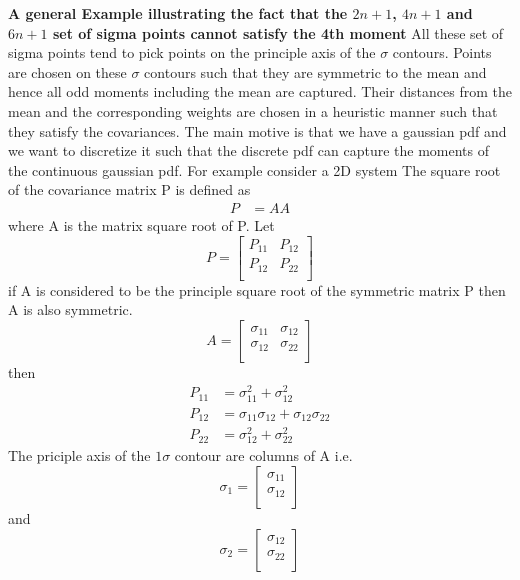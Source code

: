 \documentclass{article}
\begin{document}
	 
{\bf A general Example illustrating the fact that the $2n+1$, $4n+1$ and $6n+1$ set of sigma points cannot satisfy the 4th moment}\newline\newline
	All these set of sigma points tend to pick points on the principle axis of the $\sigma$ contours. Points are chosen on these $\sigma$ contours such that they are symmetric to the mean and hence all odd moments including the mean are captured. Their distances from the mean and the corresponding weights are chosen in a heuristic manner such that they satisfy the covariances. The main motive is that we have a gaussian pdf and we want to discretize it such that the discrete pdf can capture the moments of the continuous gaussian pdf. For example consider a 2D system
	The square root of the covariance matrix P is defined as 
\begin{align}
P&=AA
\end{align}
where A is the matrix square root of P. Let	
\[P=\left[ {\begin{array}{cc}
 P_{11} & P_{12}  \\
 P_{12} & P_{22}  \\
 \end{array} } \right]\]
if A is considered to be the principle square root of the symmetric matrix P then A is also symmetric. \newline
\[A=\left[ {\begin{array}{cc}
 \sigma_{11} & \sigma_{12}  \\
 \sigma_{12} & \sigma_{22}  \\
 \end{array} } \right]\]
 then 
 \begin{align}
 P_{11}&=\sigma_{11}^2+\sigma_{12}^2 \label{eq:pp1} \\ 
 P_{12}&=\sigma_{11}\sigma_{12}+\sigma_{12}\sigma_{22}\\
 P_{22}&=\sigma_{12}^2+\sigma_{22}^2 \label{eq:pp2}
 \end{align}
 The priciple axis of the $1\sigma$ contour are columns of A i.e.
 \[\sigma_1=\left[ {\begin{array}{c}
 \sigma_{11}  \\
 \sigma_{12}  \\
 \end{array} } \right]\]
 and
  \[\sigma_2=\left[ {\begin{array}{c}
 \sigma_{12}  \\
 \sigma_{22}  \\
 \end{array} } \right]\]
\end{document}
